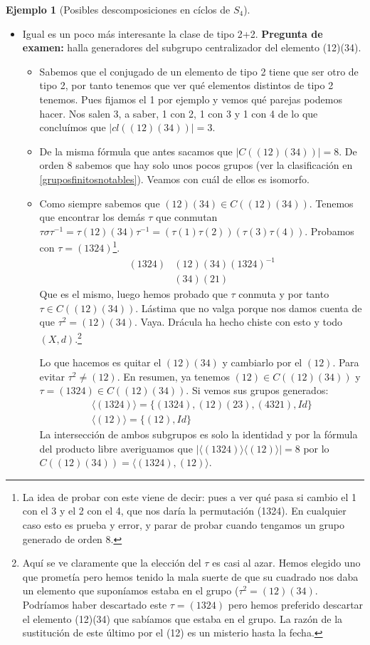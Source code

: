 \documentclass{book}
\theoremstyle{definition}
\newtheorem{ej}{Ejemplo}
\theoremstyle{remark}
\newcommand{\inv}[1]{#1^{-1}}
\begin{document}
\begin{ej}[Posibles descomposiciones en cíclos de $S_4$]
\begin{itemize}
		\item Igual es un poco más interesante la clase de tipo 2+2. \textbf{Pregunta de examen:} halla generadores del subgrupo centralizador del elemento (12)(34).
		\begin{itemize}
			\item Sabemos que el conjugado de un elemento de tipo 2 tiene que ser otro de tipo 2, por tanto tenemos que ver qué elementos distintos de tipo 2 tenemos. Pues fijamos el 1 por ejemplo y vemos qué parejas podemos hacer. Nos salen 3, a saber, 1 con 2, 1 con 3 y 1 con 4 de lo que concluímos que $|cl((12)(34))| = 3$.
			\item De la misma fórmula que antes sacamos que $|C((12)(34))| = 8$. De orden 8 sabemos que hay solo unos pocos grupos (ver la clasificación en \ref{gruposfinitosnotables}). Veamos con cuál de ellos es isomorfo.
			\item Como siempre sabemos que $(12)(34) \in C((12)(34))$. Tenemos que encontrar los demás $\tau$ que conmutan $\tau \sigma \inv{\tau} = \tau (12)(34) \inv{\tau} = (\tau(1)\tau(2))(\tau(3)\tau(4))$. Probamos con $\tau = (1324)$\footnote{La idea de probar con este viene de decir: pues a ver qué pasa si cambio el 1 con el 3 y el 2 con el 4, que nos daría la permutación (1324). En cualquier caso esto es prueba y error, y parar de probar cuando tengamos un grupo generado de orden 8.}.
			\begin{align*}
				(1324)&(12)(34)\inv{(1324)} \\
					  &(34)(21)
			\end{align*}
			Que es el mismo, luego hemos probado que $\tau$ conmuta y por tanto $\tau \in C((12)(34))$. Lástima que no valga porque nos damos cuenta de que $\tau ^2 = (12)(34)$. Vaya. Drácula ha hecho chiste con esto y todo $(X,d)$.\footnote{Aquí se ve claramente que la elección del $\tau$ es casi al azar. Hemos elegido uno que prometía pero hemos tenido la mala suerte de que su cuadrado nos daba un elemento que suponíamos estaba en el grupo ($\tau^2 = (12)(34)$. Podríamos haber descartado este $\tau = (1324)$ pero hemos preferido descartar el elemento (12)(34) que sabíamos que estaba en el grupo. La razón de la sustitución de este último por el (12) es un misterio hasta la fecha.}
			
			Lo que hacemos es quitar el $(12)(34)$ y cambiarlo por el $(12)$. Para evitar $\tau^2 \neq (12)$. En resumen, ya tenemos $(12) \in C((12)(34))$ y $\tau = (1324) \in C((12)(34))$. Si vemos sus grupos generados:
			\begin{align*}
				\langle (1324)\rangle = \{(1324), (12)(23), (4321), Id\} \\
				\langle (12) \rangle = \{(12), Id\}
			\end{align*}
			La intersección de ambos subgrupos es solo la identidad y por la fórmula del producto libre averiguamos que $|\langle (1324)\rangle \langle (12) \rangle| = 8$ por lo $C((12)(34)) = \langle (1324), (12) \rangle$.
			

\end{itemize}
\end{itemize}
\end{ej}
\end{document}
